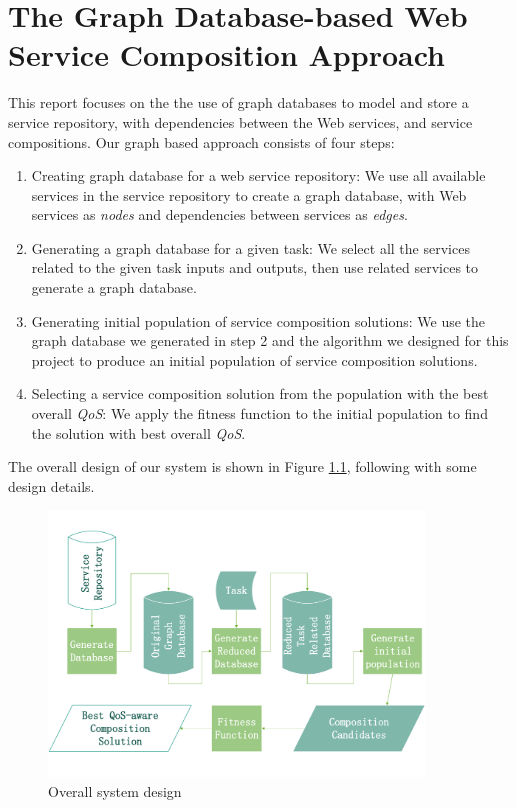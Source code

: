 \chapter{The Graph Database-based Web Service Composition Approach}\label{C:wd}
This report focuses on the the use of graph databases to model and store a service repository, with dependencies between the Web services, and service compositions. Our graph based approach consists of four steps:\par
\begin{enumerate}
  \item Creating graph database for a web service repository: We use all available services in the service repository to create a graph database, with Web services as \emph{nodes} and dependencies between services as \emph{edges}.\par

  \item Generating a graph database for a given task: We select all the services related to the given task inputs and outputs, then use related services to generate a graph database.\par

  \item Generating initial population of service composition solutions: We use the graph database we generated in step 2 and the algorithm we designed for this project to produce an initial population of service composition solutions.\par

  \item Selecting a service composition solution from the population with the best overall \emph{QoS}: We apply the fitness function to the initial population to find the solution with best overall \emph{QoS}.\par

\end{enumerate}
The overall design of our system is shown in Figure \ref{fig:process}, following with some design details.\par

\begin{figure}[h]
\includegraphics[width=10cm]{process2.pdf}
\centering
\caption{Overall system design}
\label{fig:process} 
\end{figure} 

